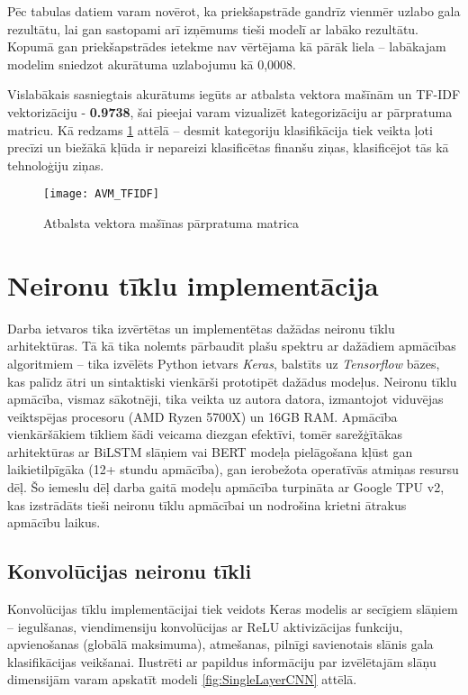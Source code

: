 Pēc tabulas datiem varam novērot, ka priekšapstrāde gandrīz vienmēr uzlabo gala rezultātu, lai gan sastopami arī izņēmums tieši modelī ar labāko rezultātu. Kopumā gan priekšapstrādes ietekme nav vērtējama kā pārāk liela – labākajam modelim sniedzot akurātuma uzlabojumu kā 0,0008. 

Vislabākais sasniegtais akurātums iegūts ar atbalsta vektora mašīnām un TF-IDF vektorizāciju - \textbf{0.9738}, šai pieejai varam vizualizēt kategorizāciju ar pārpratuma matricu. Kā redzams \ref{fig:AVM_TFIDF} attēlā – desmit  kategoriju klasifikācija tiek veikta ļoti precīzi un biežākā kļūda ir nepareizi klasificētas finanšu ziņas, klasificējot tās kā tehnoloģiju ziņas.

\begin{figure}[H]
	\centering
	\texttt{[image: AVM\_TFIDF]}
	\caption{Atbalsta vektora mašīnas pārpratuma matrica}
	\label{fig:AVM_TFIDF}
\end{figure}

\pagebreak
\section{Neironu tīklu implementācija}

Darba ietvaros tika izvērtētas un implementētas dažādas neironu tīklu arhitektūras. Tā kā tika nolemts pārbaudīt plašu spektru ar dažādiem apmācības algoritmiem – tika izvēlēts Python ietvars \textit{Keras}, balstīts uz \textit{Tensorflow} bāzes, kas palīdz ātri un sintaktiski vienkārši prototipēt dažādus modeļus. Neironu tīklu apmācība, vismaz sākotnēji, tika veikta uz autora datora, izmantojot viduvējas veiktspējas procesoru (AMD Ryzen 5700X) un 16GB RAM. Apmācība vienkāršākiem tīkliem šādi veicama diezgan efektīvi, tomēr sarežģītākas arhitektūras ar BiLSTM slāņiem vai BERT modeļa pielāgošana kļūst gan laikietilpīgāka (12+ stundu apmācība), gan ierobežota operatīvās atmiņas resursu dēļ. Šo iemeslu dēļ darba gaitā modeļu apmācība turpināta ar Google TPU v2, kas izstrādāts tieši neironu tīklu apmācībai un nodrošina krietni ātrakus apmācību laikus.

\subsection{Konvolūcijas neironu tīkli}
Konvolūcijas tīklu implementācijai tiek veidots Keras modelis ar secīgiem slāņiem – iegulšanas, viendimensiju konvolūcijas ar ReLU aktivizācijas funkciju, apvienošanas (globālā maksimuma), atmešanas, pilnīgi savienotais slānis gala klasifikācijas veikšanai. Ilustrēti ar papildus informāciju par izvēlētajām slāņu dimensijām varam apskatīt modeli \ref{fig:SingleLayerCNN} attēlā.

